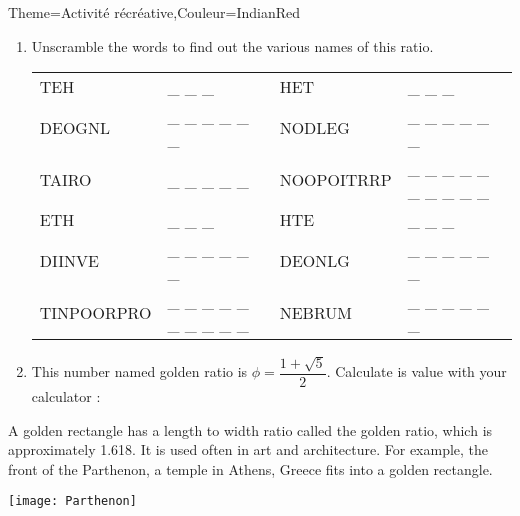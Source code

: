\begin{Maquette}[Cours]{Theme={Activité récréative},Couleur={IndianRed}}
\begin{enumerate}
         \item Unscramble the words to find out the various names of this ratio.
            \begin{center}
               {
               \begin{tabular}{|p{3cm}p{4cm}|p{3cm}p{4cm}|}
                  \hline
                  TEH & \_ \_ \_ & HET & \_ \_ \_ \\
                  DEOGNL & \_ \_ \_ \_ \_ \_ & NODLEG & \_ \_ \_ \_ \_ \_ \\
                  TAIRO & \_ \_ \_ \_ \_ & NOOPOITRRP & \_ \_ \_ \_ \_ \_ \_ \_ \_ \_ \\
                  \hline
                  ETH & \_ \_ \_ & HTE & \_ \_ \_ \\
                  DIINVE & \_ \_ \_ \_ \_ \_ & DEONLG & \_ \_ \_ \_ \_ \_ \\
                  TINPOORPRO & \_ \_ \_ \_ \_ \_ \_ \_ \_ \_ & NEBRUM & \_ \_ \_ \_ \_ \_ \\
                  \hline
               \end{tabular}}
            \end{center}
         \item This number named golden ratio is $\phi =\dfrac{1+\sqrt5}{2}$. Calculate is value with your calculator : \pointilles
      \end{enumerate}
   
      \bigskip
   
      \begin{minipage}{11cm}
         A golden rectangle has a length to width ratio called the golden ratio, which is approximately 1.618. It is used often in art and architecture. For example, the front of the Parthenon, a temple in Athens, Greece fits into a golden rectangle.
      \end{minipage}
      \qquad
      \begin{minipage}{5cm}
         \texttt{[image: Parthenon]}
      \end{minipage}

\end{Maquette}